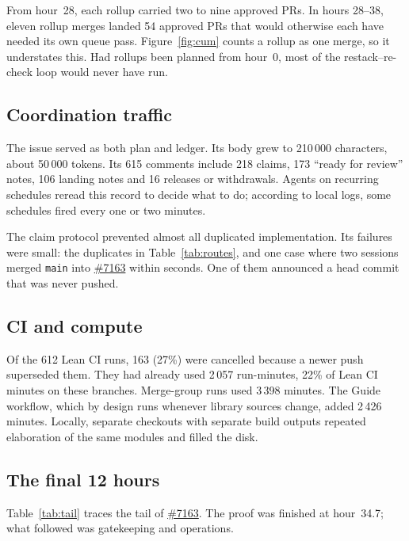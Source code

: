 \documentclass[11pt]{article}
\newcommand{\pr}[1]{\href{https://github.com/cslib-community/cslib-frontier/pull/#1}{\##1}}
\newcommand{\code}[1]{\texttt{\small #1}}
\begin{document}
From hour~28, each rollup carried two to nine approved PRs. In hours 28--38, eleven rollup
merges landed 54 approved PRs that would otherwise each have needed its own queue pass. Figure~\ref{fig:cum}
counts a rollup as one merge, so it understates this. Had rollups been planned from hour~0,
most of the restack--re-check loop would never have run.

\subsection{Coordination traffic}
The issue served as both plan and ledger. Its body grew to 210\,000 characters, about 50\,000
tokens. Its 615 comments include 218 claims, 173 ``ready for review'' notes, 106 landing notes and
16 releases or withdrawals. Agents on recurring schedules reread this record to decide what to do;
according to local logs, some schedules fired every one or two minutes.

The claim protocol prevented almost all duplicated implementation. Its failures were small: the
duplicates in Table~\ref{tab:routes}, and one case where two sessions merged \code{main} into
\pr{7163} within seconds. One of them announced a head commit that was never pushed.

\subsection{CI and compute}
Of the 612 Lean CI runs, 163 (27\%) were cancelled because a newer push superseded them. They had
already used 2\,057 run-minutes, 22\% of Lean CI minutes on these branches. Merge-group runs used
3\,398 minutes. The Guide workflow, which by design runs whenever library sources change, added
2\,426 minutes. Locally, separate checkouts with separate build outputs repeated elaboration of
the same modules and filled the disk.

\subsection{The final 12 hours}\label{sec:tail}
Table~\ref{tab:tail} traces the tail of \pr{7163}. The proof was finished at hour~34.7; what
followed was gatekeeping and operations.
\end{document}
